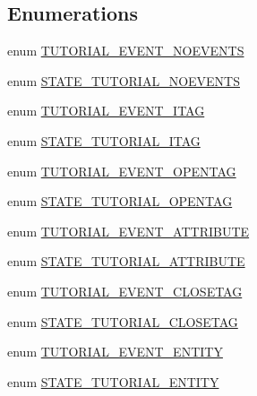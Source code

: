 \subsection*{\-Enumerations}
\begin{DoxyCompactItemize}
\item 
enum \hyperlink{_tutorial_highlight_parser_8inc_a1131f167f9c19e57e3132bb77bb299a6}{\-T\-U\-T\-O\-R\-I\-A\-L\-\_\-\-E\-V\-E\-N\-T\-\_\-\-N\-O\-E\-V\-E\-N\-T\-S} 
\item 
enum \hyperlink{_tutorial_highlight_parser_8inc_a05970ac789e21b83187b967720699751}{\-S\-T\-A\-T\-E\-\_\-\-T\-U\-T\-O\-R\-I\-A\-L\-\_\-\-N\-O\-E\-V\-E\-N\-T\-S} 
\item 
enum \hyperlink{_tutorial_highlight_parser_8inc_a650b3043f56a7bccf67e20da7718bee6}{\-T\-U\-T\-O\-R\-I\-A\-L\-\_\-\-E\-V\-E\-N\-T\-\_\-\-I\-T\-A\-G} 
\item 
enum \hyperlink{_tutorial_highlight_parser_8inc_a9264cd810de627a229bd2537b7ab58c3}{\-S\-T\-A\-T\-E\-\_\-\-T\-U\-T\-O\-R\-I\-A\-L\-\_\-\-I\-T\-A\-G} 
\item 
enum \hyperlink{_tutorial_highlight_parser_8inc_a840f5a2082ceee4c21a88aeac656056d}{\-T\-U\-T\-O\-R\-I\-A\-L\-\_\-\-E\-V\-E\-N\-T\-\_\-\-O\-P\-E\-N\-T\-A\-G} 
\item 
enum \hyperlink{_tutorial_highlight_parser_8inc_afc82c1bdbcf8daa57fa0ebc3fce0bfd7}{\-S\-T\-A\-T\-E\-\_\-\-T\-U\-T\-O\-R\-I\-A\-L\-\_\-\-O\-P\-E\-N\-T\-A\-G} 
\item 
enum \hyperlink{_tutorial_highlight_parser_8inc_ae4f1874a3d12369c4a7a9c02db68a943}{\-T\-U\-T\-O\-R\-I\-A\-L\-\_\-\-E\-V\-E\-N\-T\-\_\-\-A\-T\-T\-R\-I\-B\-U\-T\-E} 
\item 
enum \hyperlink{_tutorial_highlight_parser_8inc_a0462abe51fd090700487868ccb0ca2d2}{\-S\-T\-A\-T\-E\-\_\-\-T\-U\-T\-O\-R\-I\-A\-L\-\_\-\-A\-T\-T\-R\-I\-B\-U\-T\-E} 
\item 
enum \hyperlink{_tutorial_highlight_parser_8inc_acc1135dd077e1b8fa944696d6a7b9e83}{\-T\-U\-T\-O\-R\-I\-A\-L\-\_\-\-E\-V\-E\-N\-T\-\_\-\-C\-L\-O\-S\-E\-T\-A\-G} 
\item 
enum \hyperlink{_tutorial_highlight_parser_8inc_a9dfbcfe8f1f06e0694bc59a9550b35f9}{\-S\-T\-A\-T\-E\-\_\-\-T\-U\-T\-O\-R\-I\-A\-L\-\_\-\-C\-L\-O\-S\-E\-T\-A\-G} 
\item 
enum \hyperlink{_tutorial_highlight_parser_8inc_ae1f3c203c80a35371a39a22876ce5db8}{\-T\-U\-T\-O\-R\-I\-A\-L\-\_\-\-E\-V\-E\-N\-T\-\_\-\-E\-N\-T\-I\-T\-Y} 
\item 
enum \hyperlink{_tutorial_highlight_parser_8inc_a579ced308565d74e874efee5dd85643c}{\-S\-T\-A\-T\-E\-\_\-\-T\-U\-T\-O\-R\-I\-A\-L\-\_\-\-E\-N\-T\-I\-T\-Y} 

\end{DoxyCompactItemize}
